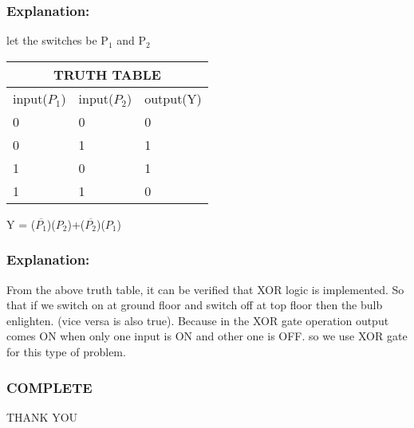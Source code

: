 \documentclass{beamer}
\begin{document}
   \begin{frame}
\frametitle{Explanation:}
  
 let the switches be P$_1$ and P$_2$\newline


\setlength{\arrayrulewidth}{1mm}
\setlength{\tabcolsep}{18pt}
\renewcommand{\arraystretch}{1.5}



\begin{tabular}{ |p{1cm}|p{1cm}|p{1cm}| }
\hline
\multicolumn{3}{|c|}{ TRUTH TABLE } \\
\hline
input($P_1$) & input($P_2$) & output(Y) \\
\hline
  0 & 0 & 0 \\
\hline
0 & 1 & 1 \\
\hline
1 & 0 & 1 \\
\hline
1 & 1 & 0  \\
\hline

\end{tabular}


\vspace{1cm}


Y = ($\overline{P_1}$)($P_2$)+($\overline{P_2}$)($P_1$) 
  
  
  
  
  \end{frame}
  
 \begin{frame}
\frametitle{Explanation:}  

From the above truth table, it can be verified that XOR logic is implemented.
So that if we  switch on at ground floor and switch off at top floor then the bulb enlighten. (vice versa is also true). Because in the XOR gate operation output comes ON when only one input is ON and other one is OFF. so we use XOR gate for this type of problem. 

  
   \end{frame}
   
   \begin{frame} 
   \frametitle{COMPLETE}
	    
	    \centering THANK YOU
	    
	   \end{frame}  
	    
\end{document}
